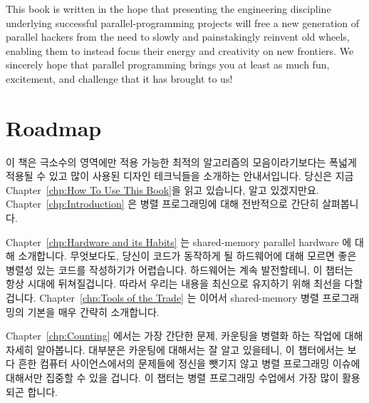 This book is written in the hope that presenting the engineering
discipline underlying successful
parallel-programming projects will free a new generation of parallel hackers
from the need to slowly and painstakingly reinvent old wheels, enabling
them to instead focus their energy and creativity on new frontiers.
We sincerely hope that parallel programming brings you at least as
much fun, excitement, and challenge that it has brought to us!
\fi

\section{Roadmap}
\label{sec:howto:Roadmap}

이 책은 극소수의 영역에만 적용 가능한 최적의 알고리즘의 모음이라기보다는 폭넓게
적용될 수 있고 많이 사용된 디자인 테크닉들을 소개하는 안내서입니다.  당신은
지금 Chapter~\ref{chp:How To Use This Book}을 읽고 있습니다, 알고 있겠지만요.
Chapter~\ref{chp:Introduction} 은 병렬 프로그래밍에 대해 전반적으로 간단히
살펴봅니다.

\iffalse
This book is a handbook of widely applicable and heavily
used design techniques, rather than
a collection of optimal algorithms with tiny areas of applicability.
You are currently reading Chapter~\ref{chp:How To Use This Book}, but
you knew that already.
Chapter~\ref{chp:Introduction} gives a high-level overview of parallel
programming.
\fi

Chapter~\ref{chp:Hardware and its Habits} 는 shared-memory parallel hardware 에
대해 소개합니다.  무엇보다도, 당신이 코드가 동작하게 될 하드웨어에 대해 모르면
좋은 병렬성 있는 코드를 작성하기가 어렵습니다. 하드웨어는 계속 발전할테니, 이
챕터는 항상 시대에 뒤쳐질겁니다.  따라서 우리는 내용을 최신으로 유지하기 위해
최선을 다할겁니다.  Chapter~\ref{chp:Tools of the Trade} 는 이어서
shared-memory 병렬 프로그래밍의 기본을 매우 간략히 소개합니다.

\iffalse
Chapter~\ref{chp:Hardware and its Habits} introduces shared-memory
parallel hardware.
After all, it is difficult to write good parallel code unless you
understand the underlying hardware.
Because hardware constantly evolves, this chapter will always be
out of date.
We will nevertheless do our best to keep up.
Chapter~\ref{chp:Tools of the Trade} then provides a very brief overview
of common shared-memory parallel-programming primitives.
\fi

Chapter~\ref{chp:Counting} 에서는 가장 간단한 문제, 카운팅을 병렬화 하는 작업에
대해 자세히 알아봅니다.  대부분은 카운팅에 대해서는 잘 알고 있을테니, 이
챕터에서는 보다 흔한 컴퓨터 사이언스에서의 문제들에 정신을 뺏기지 않고 병렬
프로그래밍 이슈에 대해서만 집중할 수 있을 겁니다.  이 챕터는 병렬 프로그래밍
수업에서 가장 많이 활용되곤 합니다.

